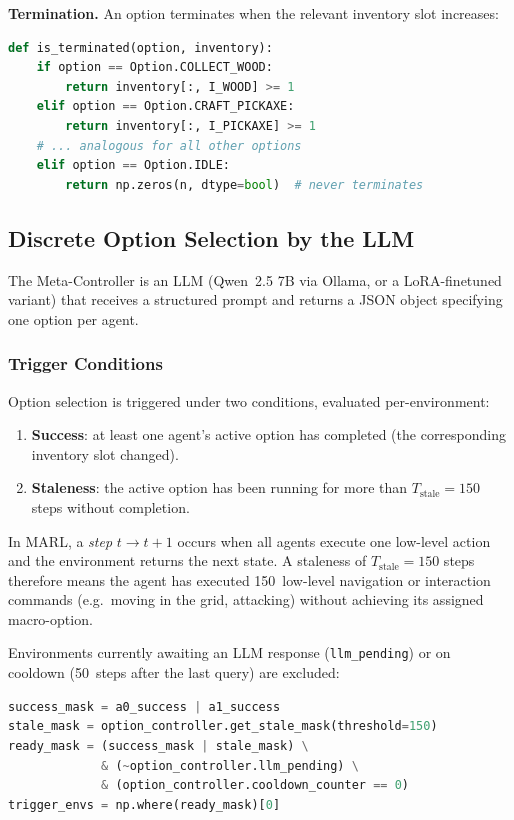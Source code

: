 \noindent
\textbf{Termination.}
An option terminates when the relevant inventory slot increases:
\begin{lstlisting}[style=code, language=Python, caption={Termination check (excerpt from \texttt{options.py}).}, label={lst:option_term}]
def is_terminated(option, inventory):
    if option == Option.COLLECT_WOOD:
        return inventory[:, I_WOOD] >= 1
    elif option == Option.CRAFT_PICKAXE:
        return inventory[:, I_PICKAXE] >= 1
    # ... analogous for all other options
    elif option == Option.IDLE:
        return np.zeros(n, dtype=bool)  # never terminates
\end{lstlisting}


\subsection{Discrete Option Selection by the LLM}
\label{sec:discrete_selection}

The Meta-Controller is an LLM (Qwen~2.5 7B via Ollama, or a LoRA-finetuned variant)
that receives a structured prompt and returns a JSON object specifying
one option per agent.

\subsubsection{Trigger Conditions}

Option selection is triggered under two conditions, evaluated per-environment:
\begin{enumerate}[nosep]
    \item \textbf{Success}: at least one agent's active option has completed
          (the corresponding inventory slot changed).
    \item \textbf{Staleness}: the active option has been running for more
          than $T_{\text{stale}}=150$ steps without completion.
\end{enumerate}

\noindent
In MARL, a \emph{step} $t \to t{+}1$ occurs when all agents execute one
low-level action and the environment returns the next state.
A staleness of $T_{\text{stale}}=150$ steps therefore means the agent
has executed 150~low-level navigation or interaction commands (e.g.\
moving in the grid, attacking) without achieving its assigned
macro-option.

Environments currently awaiting an LLM response (\texttt{llm\_pending})
or on cooldown (50~steps after the last query) are excluded:
\begin{lstlisting}[style=code, language=Python, caption={Trigger logic in \texttt{hrl\_train\_loop.py}.}, label={lst:hrl_trigger}]
success_mask = a0_success | a1_success
stale_mask = option_controller.get_stale_mask(threshold=150)
ready_mask = (success_mask | stale_mask) \
             & (~option_controller.llm_pending) \
             & (option_controller.cooldown_counter == 0)
trigger_envs = np.where(ready_mask)[0]
\end{lstlisting}

